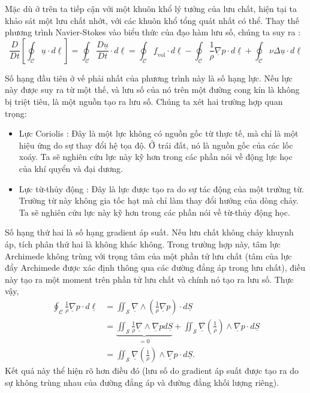 \documentclass[CO_LUU_CHAT.tex]{subfiles}
\begin{document}
	Mặc dù ở trên ta tiếp cận với một khuôn khổ lý tưởng của lưu chất, hiện tại ta khảo sát một lưu chất nhớt, với các khuôn khổ tổng quát nhất có thể. Thay thế phương trình Navier-Stokes vào biểu thức của đạo hàm lưu số, chúng ta suy ra :
	$$
		\frac{D}{{Dt}}\left[ {\oint_\mathscr{C} {\underline u  \cdot d\underline\ell } } \right] = \oint_\mathscr{C} {\frac{{D\underline u }}{{Dt}} \cdot d\underline\ell}  = \oint_\mathscr{C} {\underline{f}_{\text{vol}}  \cdot d\underline\ell}  - \oint_\mathscr{C} {\frac{1}{\rho }{\underline{\nabla}p} \cdot d\underline\ell}  + \oint_\mathscr{C} {\nu \Delta \underline u  \cdot d\underline\ell}
	$$

	Số hạng đầu tiên ở vế phải nhất của phương trình này là số hạng lực. Nếu lực này  được suy ra từ một thế, và lưu số của nó trên một đường cong kín là không bị triệt tiêu, là một nguồn tạo ra lưu số. Chúng ta xét hai trường hợp quan trọng:
	\begin{itemize}
		\item Lực Coriolis : Đây là một lực không có nguồn gốc từ thực tế, mà chỉ là một hiệu ứng do sự thay đổi hệ tọa độ. Ở trái đất, nó là nguồn gốc của các lốc xoáy. Ta sẽ nghiên cứu lực này kỹ hơn trong các phần nói về động lực học của khí quyển và đại dương.
		\item Lực từ-thủy động : Đây là lực được tạo ra do sự tác động của một trường từ. Trường từ này không gia tốc hạt mà chỉ làm thay đổi hướng của dòng chảy. Ta sẽ nghiên cứu lực này kỹ hơn trong các phần nói về từ-thủy động học.
	\end{itemize}

	Số hạng thứ hai là số hạng gradient áp suất. Nếu lưu chất không chảy khuynh áp, tích phân thứ hai là không khác không. Trong trường hợp này, tâm lực Archimede không trùng với trọng tâm của một phần tử lưu chất (tâm của lực đẩy Archimede được xác định thông qua các đường đẳng áp trong lưu chất), điều này tạo ra một moment trên phần tử lưu chất và chính nó tạo ra lưu số. Thực vậy,
	\[
		\begin{aligned}
			\oint_\mathscr{C} {\frac{1}{\rho } {\underline {\nabla} p}\cdot d\underline \ell }
			&= \iint_\mathscr{S} {\underline {\nabla}\wedge\left({\frac{1}{\rho } {\underline {\nabla} p}}\right)\cdot d\underline S}\\
			&=\underbrace{\iint_\mathscr{S}\frac{1}{\rho}\underline{\nabla}\wedge\underline{\nabla}pd\underline{S}}_{=0}+\iint_\mathscr{S}\underline{\nabla}\left( \frac{1}{\rho}\right) \wedge \underline {\nabla} p \cdot d\underline S\\
			&=\iint_\mathscr{S}\underline{\nabla}\left( \frac{1}{\rho}\right) \wedge \underline {\nabla} p \cdot d\underline S.
		\end{aligned}
	\]
	Kết quả này thể hiện rõ hơn điều đó (lưu số do gradient áp suất được tạo ra do sự không trùng nhau của đường đẳng áp và đường đẳng khối lượng riêng).
\end{document}
